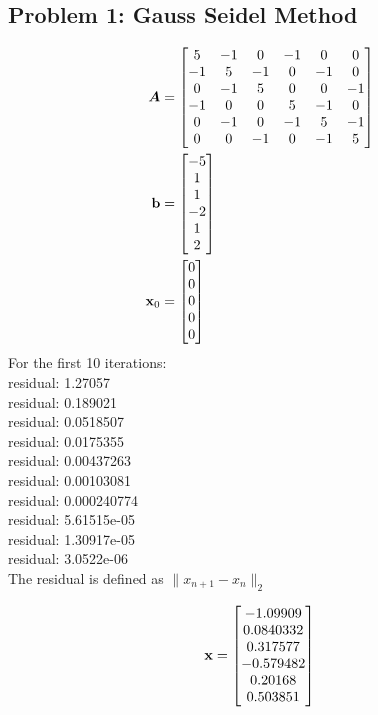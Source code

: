 \documentclass{article}
\begin{document}
 



\hypertarget{problem_0_homework_checklist_2}{}
\subsection*{{Problem 1: Gauss Seidel Method}}
\label{}
\begin{align} 
\boldsymbol{A} &= \begin{bmatrix} 5 & -1 & 0 & -1 & 0 & 0  \\ 
-1 & 5 & -1 & 0 & -1 & 0  \\ 
0 & -1 & 5 & 0 & 0 & -1  \\ 
-1 & 0 & 0 & 5 & -1 & 0  \\ 
0 & -1 & 0 & -1 & 5 & -1  \\ 
0 & 0 & -1 & 0 & -1 & 5  \\  \end{bmatrix}\\
\boldsymbol{\mathrm{b}} &=\begin{bmatrix} -5 \\ 1\\ 1\\ -2 \\ 1 \\ 2  \end{bmatrix} \\
\boldsymbol{\mathrm{x}}_0 &=\begin{bmatrix} 0 \\ 0 \\ 0 \\ 0 \\ 0  \end{bmatrix}
\end{align} 
For the first 10 iterations:  \\
residual: 1.27057 \\
residual: 0.189021 \\
residual: 0.0518507 \\
residual: 0.0175355 \\
residual: 0.00437263 \\
residual: 0.00103081 \\
residual: 0.000240774 \\
residual: 5.61515e-05 \\
residual: 1.30917e-05 \\
residual: 3.0522e-06 \\

The residual is defined as   $\|x_{n+1}-x_{n}\|_2$ 

\begin{align}
\boldsymbol{\mathrm{x}} =\begin{bmatrix} -1.09909\\
0.0840332\\
0.317577\\
-0.579482\\
0.20168\\
0.503851 \end{bmatrix}
\end{align} 
\end{document}
